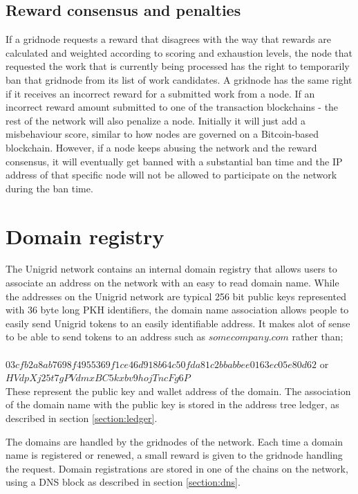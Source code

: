 \documentclass[10pt,a4paper,final]{article}
\begin{document}
\subsection{Reward consensus and penalties}
If a \gls{gridnode} requests a reward that disagrees with the way that rewards are calculated and weighted according to scoring and exhaustion levels, the node that requested the work that is currently being processed has the right to temporarily ban that \gls{gridnode} from its list of work candidates. A \gls{gridnode} has the same right if it receives an incorrect reward for a submitted work from a node. If an incorrect reward amount submitted to one of the transaction blockchains - the rest of the network will also penalize a node. Initially it will just add a misbehaviour score, similar to how nodes are governed on a Bitcoin-based blockchain. However, if a node keeps abusing the network and the reward consensus, it will eventually get banned with a substantial ban time and the IP address of that specific node will not be allowed to participate on the network during the ban time.

\section{Domain registry}
\label{section:domain}
The Unigrid network contains an internal domain registry that allows users to associate an address on the network with an easy to read domain name. While the addresses on the Unigrid network are typical 256 bit public keys represented with 36 byte long PKH identifiers, the domain name association allows people to easily send Unigrid tokens to an easily identifiable address. It makes alot of sense to be able to send tokens to an address such as $somecompany.com$ rather than;
\\ \\
$03cfb2a8ab7698f4955369f1ce46d918b64c50fda81c2bbabbee0163ec05e80d62$ or\\
$HVdpXj25t7gPVdmxBC5kxbv9hojTncFg6P$\\

\noindent These represent the public key and wallet address of the domain. The association of the domain name with the public key is stored in the address tree ledger, as described in section \ref{section:ledger}.

The domains are handled by the \glspl{gridnode} of the network. Each time a domain name is registered or renewed, a small reward is given to the \gls{gridnode} handling the request. Domain registrations are stored in one of the chains on the network, using a DNS block as described in section \ref{section:dns}.
\end{document}
